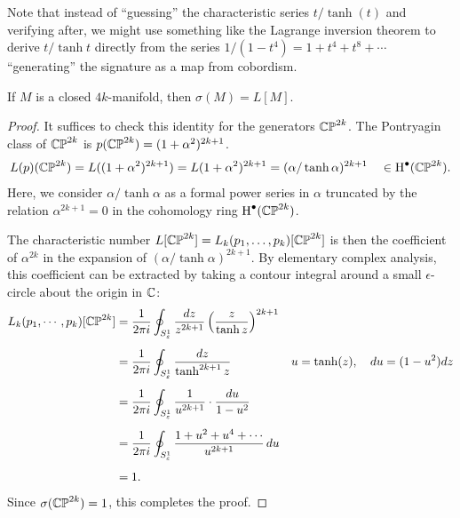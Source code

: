 \begin{remark*}
	Note that instead of ``guessing'' the characteristic series $t/\tanh(t)$ and verifying after, we might use something like the Lagrange inversion theorem to derive $t/\tanh t$ directly from the series $1/(1-t^4)=1+t^4+t^8+\cdots$ ``generating'' the signature as a map from cobordism. 
\end{remark*}

\begin{theorem}[Hirzebruch]\label{thm:hirzebruch-signature-theorem}
	If $M$ is a closed $4k$-manifold, then $\sigma(M) = L[M]$.
\end{theorem}
\begin{proof}
	It suffices to check this identity for the generators $\mathbb{CP}^{2k}$. The Pontryagin class of $\mathbb{CP}^{2k}$ is $p(\mathbb{CP}^{2k})=(1+\alpha^2)^{2k+1}$.
	\[
		\begin{aligned}
			L(p)(\mathbb{CP}^{2k})
			= L((1+\alpha^2)^{2k+1})
			= L(1+\alpha^2)^{2k+1}
			= (\alpha/\tanh \alpha)^{2k+1}
			\quad\in\operatorname{H}^\bullet(\mathbb{CP}^{2k}).
		\end{aligned}
	\]
	Here, we consider $\alpha/\tanh \alpha$ as a formal power series in $\alpha$ truncated by the relation $\alpha^{2k+1}=0$ in the cohomology ring $\operatorname{H}^\bullet(\mathbb{CP}^{2k})$. 

	The characteristic number $L[\mathbb{CP}^{2k}]=L_k(p_1,\ldots,p_k)[\mathbb{CP}^{2k}]$ is then the coefficient of $\alpha^{2k}$ in the expansion of $(\alpha/\tanh \alpha)^{2k+1}$.
	By elementary complex analysis, this coefficient can be extracted by taking a contour integral around a small $\epsilon$-circle about the origin in $\mathbb{C}$:
	\[
		\begin{aligned}
			L_k(p_1,\cdots, p_k)[\mathbb{CP}^{2k}]
			 & = \frac{1}{2\pi i}\oint_{S^1_\varepsilon} \frac{dz}{z^{2k+1}} \left(\frac{z}{\tanh z}\right)^{2k+1}
			 &                                                                                                    \\[0.5em]
			 & = \frac{1}{2\pi i}\oint_{S^1_\varepsilon} \frac{dz}{\tanh^{2k+1} z}\quad
			 & u  =\tanh(z),\quad
			du =(1-u^2)dz
			\\[0.5em]
			 & = \frac{1}{2\pi i}\oint_{S^1_\varepsilon} \frac{1}{u^{2k+1}}\cdot\frac{du}{1-u^2}
			 &                                                                                                    \\[0.5em]
			 & = \frac{1}{2\pi i}\oint_{S^1_\varepsilon} \frac{1+u^2+u^4+\cdots}{u^{2k+1}}\,du                       \\[0.5em]
			 & =1.                                                                                              &
		\end{aligned}
	\]
	Since $\sigma(\mathbb{CP}^{2k})=1$, this completes the proof.
\end{proof}

